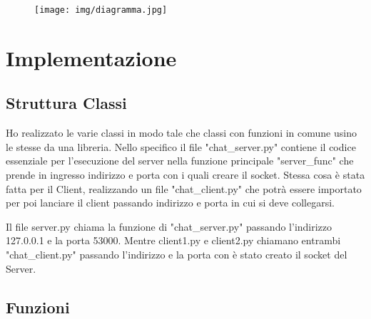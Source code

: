 \documentclass[a4paper,12pt]{report}
\begin{document}
\begin{figure}[H]
	\centering{}
	\texttt{[image: img/diagramma.jpg]}
	\label{img:diagramma}
\end{figure}

\chapter{Implementazione}

\section{Struttura Classi}
Ho realizzato le varie classi in modo tale che classi con funzioni in comune usino le stesse da una libreria.
Nello specifico il file "chat\_server.py" contiene il codice essenziale per l'esecuzione del server nella 
funzione principale "server\_func" che prende in ingresso indirizzo e porta con i quali creare il socket.
Stessa cosa è stata fatta per il Client, realizzando un file "chat\_client.py" che potrà essere importato
per poi lanciare il client passando indirizzo e porta in cui si deve collegarsi.

Il file server.py chiama la funzione di "chat\_server.py" passando l'indirizzo 127.0.0.1 e la porta 53000.
Mentre client1.py e client2.py chiamano entrambi "chat\_client.py" passando l'indirizzo e la porta con 
è stato creato il socket del Server.

\section{Funzioni}
\end{document}
